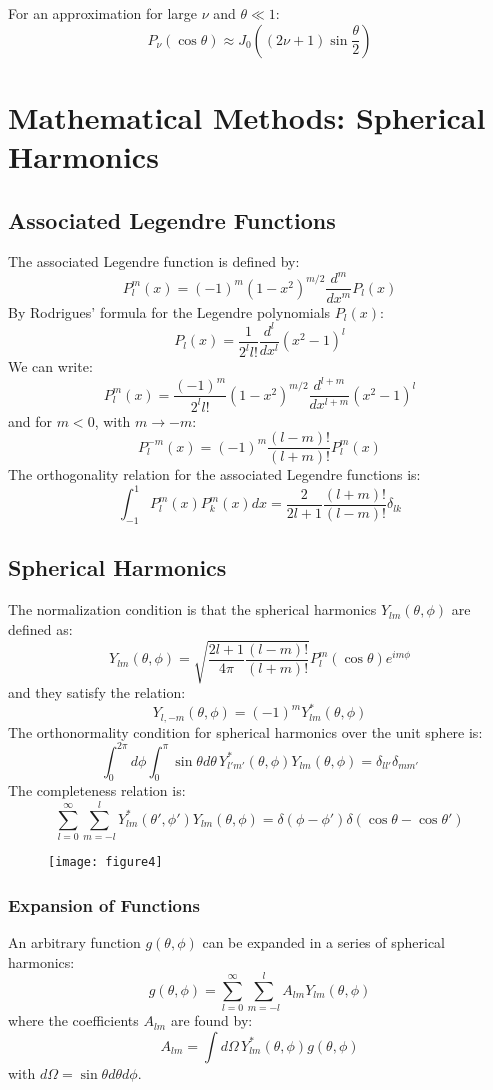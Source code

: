 \documentclass{article}
\begin{document}
	For an approximation for large $\nu$ and $\theta \ll 1$:
	\begin{equation}
		P_\nu(\cos\theta) \approx J_0((2\nu+1)\sin\frac{\theta}{2})
	\end{equation}
	
	\section{Mathematical Methods: Spherical Harmonics}
	
	\subsection{Associated Legendre Functions}
	The associated Legendre function is defined by:
	\[
	P_l^m(x) = (-1)^m (1-x^2)^{m/2} \frac{d^m}{dx^m} P_l(x)
	\]
	By Rodrigues' formula for the Legendre polynomials $P_l(x)$:
	\[
	P_l(x) = \frac{1}{2^l l!} \frac{d^l}{dx^l} (x^2-1)^l
	\]
	We can write:
	\[
	P_l^m(x) = \frac{(-1)^m}{2^l l!} (1-x^2)^{m/2} \frac{d^{l+m}}{dx^{l+m}} (x^2-1)^l
	\]
	and for $m<0$, with $m \to -m$:
	\[
	P_l^{-m}(x) = (-1)^m \frac{(l-m)!}{(l+m)!} P_l^m(x)
	\]
	The orthogonality relation for the associated Legendre functions is:
	\[
	\int_{-1}^{1} P_l^m(x) P_k^m(x) dx = \frac{2}{2l+1} \frac{(l+m)!}{(l-m)!} \delta_{lk}
	\]
	
	\subsection{Spherical Harmonics}
	The normalization condition is that the spherical harmonics $Y_{lm}(\theta, \phi)$ are defined as:
	\[
	Y_{lm}(\theta, \phi) = \sqrt{\frac{2l+1}{4\pi} \frac{(l-m)!}{(l+m)!}} P_l^m(\cos\theta) e^{im\phi}
	\]
	and they satisfy the relation:
	\[
	Y_{l,-m}(\theta, \phi) = (-1)^m Y_{lm}^*(\theta, \phi)
	\]
	The orthonormality condition for spherical harmonics over the unit sphere is:
	\[
	\int_{0}^{2\pi} d\phi \int_{0}^{\pi} \sin\theta d\theta \, Y_{l'm'}^*(\theta, \phi) Y_{lm}(\theta, \phi) = \delta_{ll'} \delta_{mm'}
	\]
	The completeness relation is:
	\[
	\sum_{l=0}^{\infty} \sum_{m=-l}^{l} Y_{lm}^*(\theta', \phi') Y_{lm}(\theta, \phi) = \delta(\phi - \phi') \delta(\cos\theta - \cos\theta')
	\]
	
	\begin{figure}[h]
		\centering
		\texttt{[image: figure4]}
		\caption{}
		\label{fig:figure4}
	\end{figure}
	
	\subsubsection{Expansion of Functions}
	An arbitrary function $g(\theta, \phi)$ can be expanded in a series of spherical harmonics:
	\[
	g(\theta, \phi) = \sum_{l=0}^{\infty} \sum_{m=-l}^{l} A_{lm} Y_{lm}(\theta, \phi)
	\]
	where the coefficients $A_{lm}$ are found by:
	\[
	A_{lm} = \int d\Omega \, Y_{lm}^*(\theta, \phi) g(\theta, \phi)
	\]
	with $d\Omega = \sin\theta d\theta d\phi$.
	
\end{document}
